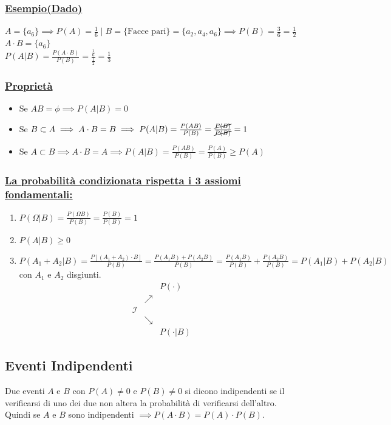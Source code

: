 \documentclass{article}
\begin{document}
\subsubsection{\underline{Esempio(Dado)}}
$A = \{a_6\} \implies P(A) = \frac1 6 \;\big|\; B = \{\text{Facce pari}\} = \{a_2,a_4,a_6\} \implies P(B) = \frac3 6 = \frac 1 2$ \\
$A \cdot B = \{a_6\} $ \\
$P(A|B) = \frac{P(A \cdot B)}{P(B)} = \frac{\frac 1 6}{\frac 1 2} = \frac 1 3$

\subsubsection{\underline{Proprietà}}
\begin{itemize}
    \item Se $AB = \phi \implies P(A|B) = 0$
    \item Se $B \subset A \implies A \cdot B = B \implies P(A|B) = \frac{P(AB)}{P(B)} = \frac{\cancel {P(B)}}{\cancel {P(B)}} = 1$
    \item Se $A \subset B \implies A \cdot B = A \implies P(A|B) = \frac{P(AB)}{P(B)} = \frac{P(A)}{P(B)} \geq P(A)$
\end{itemize}

\subsubsection{\underline{La probabilità condizionata rispetta i 3 assiomi fondamentali:}}
\begin{enumerate}
    \item $P(\Omega | B) = \frac{P(\Omega B)}{P(B)} = \frac{P(B)}{P(B)} = 1$
    \item $P(A|B) \geq 0$
    \item $P(A_1+A_2 |B) = \frac{P[(A_1+A_2)\cdot B]}{P(B)} = \frac{P(A_1B) + P(A_2B)}{P(B)} = \frac{P(A_1B)}{P(B)} + \frac{P(A_2B)}{P(B)} = P(A_1|B)+P(A_2|B)$ con $A_1$ e $A_2$ disgiunti. \\
    \[\begin{matrix}
    & & P(\cdot) \\
     & \nearrow & & \\
    \mathcal{I} & && \\
     & \searrow & &\\
    & & P(\cdot |B)
    \end{matrix}\]
\end{enumerate}

\subsection{Eventi Indipendenti}
Due eventi $A$ e $B$ con $P(A)\neq0$ e $P(B)\neq0$ si dicono indipendenti se il verificarsi di uno dei due non altera la probabilità di verificarsi dell'altro. \\
Quindi se $A$ e $B$ sono indipendenti $\implies P(A\cdot B)=P(A)\cdot P(B)$.
\end{document}
